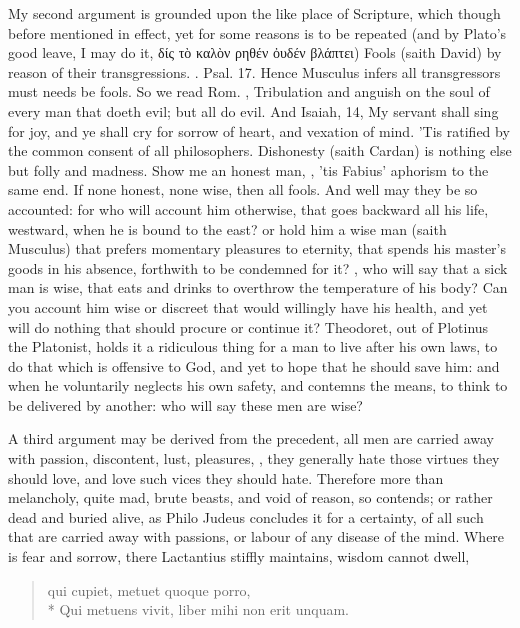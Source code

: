 My second argument is grounded upon the like place of Scripture, which
though before mentioned in effect, yet for some reasons is to be
repeated (and by Plato's good leave, I may do it, \textgreek{δίς τὸ καλὸν
ρηθέν ὀυδέν βλάπτει}) Fools (saith David) by reason of their
transgressions. \etc{}. Psal.  17. Hence Musculus infers all
transgressors must needs be fools. So we read Rom. , Tribulation and
anguish on the soul of every man that doeth evil; but all do evil. And
Isaiah,  14, My servant shall sing for joy, and ye shall cry
for sorrow of heart, and vexation of mind. 'Tis ratified by the common
consent of all philosophers. Dishonesty (saith Cardan) is nothing else
but folly and madness.  Show me an
honest man, , 'tis Fabius' aphorism to the
same end. If none honest, none wise, then all fools. And well may they
be so accounted: for who will account him otherwise,  that goes backward all his
life, westward, when he is bound to the east? or hold him a wise man
(saith Musculus) that prefers momentary pleasures to eternity,
that spends his master's goods in his absence, forthwith to be
condemned for it? , who will say
that a sick man is wise, that eats and drinks to overthrow the
temperature of his body? Can you account him wise or discreet that
would willingly have his health, and yet will do nothing that should
procure or continue it? Theodoret, out of Plotinus the Platonist,
holds it a ridiculous thing for a man to live after his own laws, to do
that which is offensive to God, and yet to hope that he should save
him: and when he voluntarily neglects his own safety, and contemns the
means, to think to be delivered by another: who will say these men are
wise?

A third argument may be derived from the precedent, all men are
carried away with passion, discontent, lust, pleasures, \etc{}, they
generally hate those virtues they should love, and love such vices they
should hate. Therefore more than melancholy, quite mad, brute beasts,
and void of reason, so \Chrysostom{} contends; or rather dead and buried
alive, as  Philo Judeus concludes it for a certainty, of all such
that are carried away with passions, or labour of any disease of the
mind. Where is fear and sorrow, there Lactantius stiffly
maintains, wisdom cannot dwell,
%
\begin{latin}
\begin{verse}
qui cupiet, metuet quoque porro,\\*
Qui metuens vivit, liber mihi non erit unquam.
\end{verse}
\end{latin}
\translationrule%

